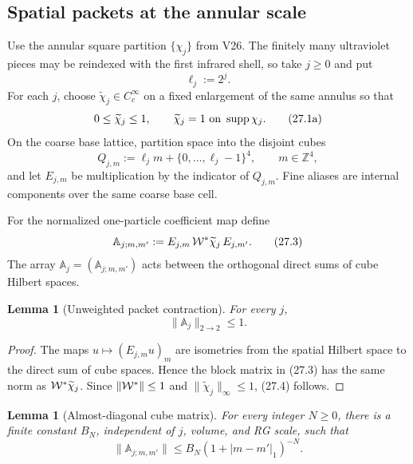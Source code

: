 \documentclass[11pt,oneside]{book}
\newtheorem{lemma}[theorem]{Lemma}
\theoremstyle{definition}
\theoremstyle{remark}
\begin{document}
\subsection{Spatial packets at the annular scale}

Use the annular square partition \(\{\chi_j\}\) from V26.  The
finitely many ultraviolet pieces may be reindexed with the first
infrared shell, so take \(j\geq0\) and put
\[
                              \ell_j:=2^j.                         \tag{27.1}
\]
For each \(j\), choose
\(\widetilde\chi_j\in C_c^\infty\) on a fixed enlargement of the same
annulus so that
\[
 0\leq\widetilde\chi_j\leq1,\qquad
 \widetilde\chi_j=1\ \hbox{on }\operatorname{supp}\chi_j.         \tag{27.1a}
\]
On the coarse base lattice, partition space into the disjoint cubes
\[
 Q_{j,m}:=\ell_jm+\{0,\ldots,\ell_j-1\}^4,
 \qquad m\in{\mathbb Z}^4,                                       \tag{27.2}
\]
and let \(E_{j,m}\) be multiplication by the indicator of
\(Q_{j,m}\).  Fine aliases are internal components over the same
coarse base cell.

For the normalized one-particle coefficient map define
\[
 {\mathbb A}_{j;m,m'}:=
 E_{j,m}\,{\cal W}^*\widetilde\chi_j\,E_{j,m'}.                   \tag{27.3}
\]
The array \({\mathbb A}_j=({\mathbb A}_{j;m,m'})\) acts between the
orthogonal direct sums of cube Hilbert spaces.

\begin{lemma}[Unweighted packet contraction]
\label{lem:e8v27-packet-contraction}
For every \(j\),
\[
                         \|{\mathbb A}_j\|_{2\to2}\leq1.           \tag{27.4}
\]
\end{lemma}

\begin{proof}
The maps \(u\mapsto(E_{j,m}u)_m\) are isometries from the spatial
Hilbert space to the direct sum of cube spaces.  Hence the block
matrix in (27.3) has the same norm as
\({\cal W}^*\widetilde\chi_j\).  Since
\(\|{\cal W}^*\|\leq1\) and
\(\|\widetilde\chi_j\|_\infty\leq1\), (27.4) follows.
\end{proof}

\begin{lemma}[Almost-diagonal cube matrix]
\label{lem:e8v27-almost-diagonal}
For every integer \(N\geq0\), there is a finite constant \(B_N\),
independent of \(j\), volume, and RG scale, such that
\[
\boxed{\qquad
 \|{\mathbb A}_{j;m,m'}\|
 \leq B_N(1+|m-m'|_1)^{-N}.
\qquad}                                                           \tag{27.5}
\]
\end{lemma}
\end{document}
